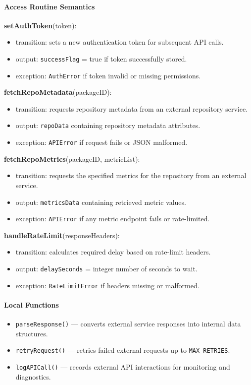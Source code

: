 \documentclass[12pt, titlepage]{article}
\begin{document}
\begin{itemize}
  \paragraph{Access Routine Semantics}

  \noindent \textbf{setAuthToken}(token):
  \begin{itemize}
    \item transition: sets a new authentication token for subsequent API calls.
    \item output: \texttt{successFlag} = true if token successfully stored.
    \item exception: \texttt{AuthError} if token invalid or missing permissions.
  \end{itemize}

  \noindent \textbf{fetchRepoMetadata}(packageID):
  \begin{itemize}
    \item transition: requests repository metadata from an external repository service.
    \item output: \texttt{repoData} containing repository metadata attributes.
    \item exception: \texttt{APIError} if request fails or JSON malformed.
  \end{itemize}

  \noindent \textbf{fetchRepoMetrics}(packageID, metricList):
  \begin{itemize}
    \item transition: requests the specified metrics for the repository from an external service.
    \item output: \texttt{metricsData} containing retrieved metric values.
    \item exception: \texttt{APIError} if any metric endpoint fails or rate-limited.
  \end{itemize}

  \noindent \textbf{handleRateLimit}(responseHeaders):
  \begin{itemize}
    \item transition: calculates required delay based on rate-limit headers.
    \item output: \texttt{delaySeconds} = integer number of seconds to wait.
    \item exception: \texttt{RateLimitError} if headers missing or malformed.
  \end{itemize}

  \paragraph{Local Functions}
  \begin{itemize}
    \item \texttt{parseResponse()} — converts external service responses into internal data structures.
    \item \texttt{retryRequest()} — retries failed external requests up to \texttt{MAX\_RETRIES}.
    \item \texttt{logAPICall()} — records external API interactions for monitoring and diagnostics.
  \end{itemize}



\end{itemize}
\end{document}
